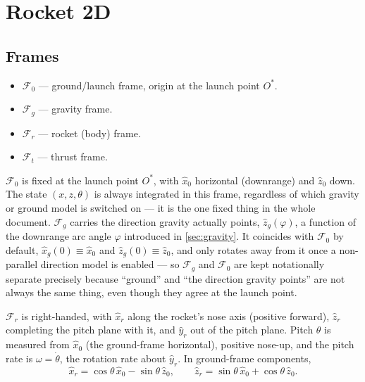 \section{Rocket 2D}\label{sec:rocket2d}

\subsection{Frames}\label{sec:frames}
\begin{itemize}
    \item $\mathcal{F}_0$ --- ground/launch frame, origin at the launch point $O^*$.
    \item $\mathcal{F}_g$ --- gravity frame.
    \item $\mathcal{F}_r$ --- rocket (body) frame.
    \item $\mathcal{F}_t$ --- thrust frame.
\end{itemize}
$\mathcal{F}_0$ is fixed at the launch point $O^*$, with $\hat{x}_0$ horizontal (downrange) and
$\hat{z}_0$ down. The state $(x,z,\theta)$ is always integrated in this frame, regardless of which
gravity or ground model is switched on --- it is the one fixed thing in the whole document.
$\mathcal{F}_g$ carries the direction gravity actually points, $\hat{z}_g(\varphi)$, a function of
the downrange arc angle $\varphi$ introduced in \autoref{sec:gravity}. It coincides with
$\mathcal{F}_0$ by default, $\hat{x}_g(0)\equiv\hat{x}_0$ and $\hat{z}_g(0)\equiv\hat{z}_0$, and
only rotates away from it once a non-parallel direction model is enabled --- so $\mathcal{F}_g$
and $\mathcal{F}_0$ are kept notationally separate precisely because ``ground'' and ``the
direction gravity points'' are not always the same thing, even though they agree at the launch
point.

$\mathcal{F}_r$ is right-handed, with $\hat{x}_r$ along the rocket's nose axis (positive forward),
$\hat{z}_r$ completing the pitch plane with it, and $\hat{y}_r$ out of the pitch plane. Pitch
$\theta$ is measured from $\hat{x}_0$ (the ground-frame horizontal), positive nose-up, and the
pitch rate is $\omega=\dot\theta$, the rotation rate about $\hat{y}_r$. In ground-frame
components,
\begin{equation}\label{eq:body_axes_in_ground}
    \hat{x}_r = \cos\theta\,\hat{x}_0 - \sin\theta\,\hat{z}_0, \qquad
    \hat{z}_r = \sin\theta\,\hat{x}_0 + \cos\theta\,\hat{z}_0.
\end{equation}


